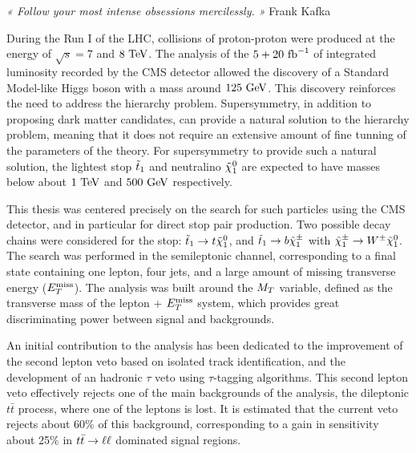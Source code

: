 \vspace*{-0.5cm}
\hspace*{0.37\textwidth}
\begin{minipage}{0.62\textwidth}
\emph{« Follow your most intense obsessions mercilessly. »}
\hspace*{0.6\textwidth} Frank Kafka
\end{minipage}

\vspace*{1cm}

During the Run I of the LHC, collisions of proton-proton were produced at the
energy of $\sqrt{s} = 7$ and $8~\text{TeV}$. The analysis of the $5+20~\text{fb}^{-1}$ of integrated luminosity
recorded by the CMS detector allowed the discovery of a Standard Model-like Higgs boson
with a mass around $125~\text{GeV}$. This discovery reinforces the need to address the hierarchy
problem. Supersymmetry, in addition to proposing dark matter candidates, can provide a natural
solution to the hierarchy problem, meaning that it does not require an extensive amount of fine
tunning of the parameters of the theory. For supersymmetry to provide such a natural solution,
the lightest stop $\tilde{t}_1$ and neutralino $\tilde{\chi}_1^0$ are expected to have masses below about
$1~\text{TeV}$ and $500~\text{GeV}$ respectively.

This thesis was centered precisely on the search for such particles using the CMS detector, and
in particular for direct stop pair production. Two possible decay chains were considered for the stop:
$\tilde{t}_1 \rightarrow t \tilde{\chi}_1^0$, and $\tilde{t}_1 \rightarrow b \tilde{\chi}_1^\pm$ with $\tilde{\chi}_1^\pm
\rightarrow W^\pm \tilde{\chi}_1^0$. The search was performed in the semileptonic channel, corresponding
to a final state containing one lepton, four jets, and a large amount of missing transverse energy
($E_T^\text{miss}$). The analysis was built around the $M_T$ variable, defined as the transverse mass of the lepton + $E_T^\text{miss}$
system, which provides great discriminating power between signal and backgrounds.

An initial contribution to the analysis has been dedicated to the improvement of the
second lepton veto based on isolated track identification, and the development of an
hadronic $\tau$ veto using $\tau$-tagging algorithms. This second lepton veto effectively
rejects one  of the main backgrounds of the analysis, the dileptonic $t\bar{t}$ process,
where one of the leptons is lost. It is estimated that the current veto rejects about
60\% of this background, corresponding to a gain in sensitivity about 25\% in $t\bar{t} \rightarrow \ell \ell$
dominated signal regions.

